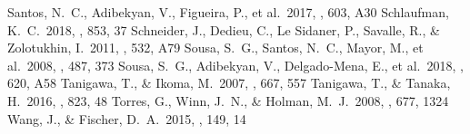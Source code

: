 \documentclass[twocolumn, dvipdfmx]{aastex62}
\begin{document}
\begin{CJK*}{UTF8}{min}
\begin{thebibliography}{}
 Santos, N.~C., Adibekyan, V., Figueira, P., et al.\ 2017, \aap, 603, A30
 Schlaufman, K.~C.\ 2018, \apj, 853, 37
 Schneider, J., Dedieu, C., Le Sidaner, P., Savalle, R., \& Zolotukhin, I.\ 2011, \aap, 532, A79
 Sousa, S.~G., Santos, N.~C., Mayor, M., et al.\ 2008, \aap, 487, 373
 Sousa, S.~G., Adibekyan, V., Delgado-Mena, E., et al.\ 2018, \aap, 620, A58
 Tanigawa, T., \& Ikoma, M.\ 2007, \apj, 667, 557
 Tanigawa, T., \& Tanaka, H.\ 2016, \apj, 823, 48
 Torres, G., Winn, J.~N., \& Holman, M.~J.\ 2008, \apj, 677, 1324
 Wang, J., \& Fischer, D.~A.\ 2015, \aj, 149, 14

\end{thebibliography}


\end{CJK*}
\end{document}
